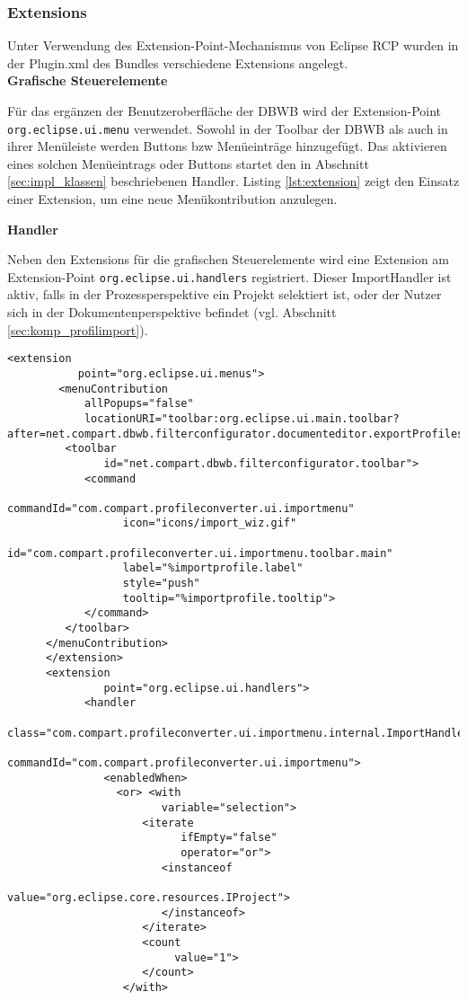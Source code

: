 {{{\subsubsection{Extensions}{
Unter Verwendung des Extension-Point-Mechanismus von Eclipse \ac{RCP} wurden in der Plugin.xml des Bundles verschiedene Extensions angelegt.\\

\textbf{Grafische Steuerelemente}{

Für das ergänzen der Benutzeroberfläche der \ac {DBWB} wird der Extension-Point 
\texttt{org.eclipse.ui.menu} verwendet. Sowohl in der Toolbar der \ac{DBWB} als auch in ihrer Menüleiste werden Buttons bzw Menüeinträge hinzugefügt. Das aktivieren eines solchen Menüeintrags oder Buttons startet den in Abschnitt \ref{sec:impl_klassen} beschriebenen Handler. Listing \ref{lst:extension} zeigt den Einsatz einer Extension, um eine neue Menükontribution anzulegen.

}
\textbf{Handler}{

Neben den Extensions für die grafischen Steuerelemente wird eine Extension am Extension-Point \texttt{org.eclipse.ui.handlers} registriert. Dieser ImportHandler ist aktiv, falls in der Prozessperspektive ein Projekt selektiert ist, oder der Nutzer sich in der Dokumentenperspektive befindet (vgl. Abschnitt \ref{sec:komp_profilimport}). 
}

 \begin{lstlisting}[caption={Toolbar Extension},label=lst:extension]
   <extension
           point="org.eclipse.ui.menus">
		<menuContribution
            allPopups="false"
            locationURI="toolbar:org.eclipse.ui.main.toolbar?after=net.compart.dbwb.filterconfigurator.documenteditor.exportProfilesButton">
         <toolbar
               id="net.compart.dbwb.filterconfigurator.toolbar">
            <command
                  commandId="com.compart.profileconverter.ui.importmenu"
                  icon="icons/import_wiz.gif"
                  id="com.compart.profileconverter.ui.importmenu.toolbar.main"
                  label="%importprofile.label"
                  style="push"
                  tooltip="%importprofile.tooltip">
            </command>
         </toolbar>
      </menuContribution>
      </extension>
      <extension
               point="org.eclipse.ui.handlers">
            <handler
                  class="com.compart.profileconverter.ui.importmenu.internal.ImportHandler"
                  commandId="com.compart.profileconverter.ui.importmenu">
               <enabledWhen>
                 <or> <with
                        variable="selection">
                     <iterate
                           ifEmpty="false"
                           operator="or">
                        <instanceof
                              value="org.eclipse.core.resources.IProject">
                        </instanceof>
                     </iterate>
                     <count  
                          value="1">  
                     </count>
                  </with>
                  

\end{lstlisting}}}}}
